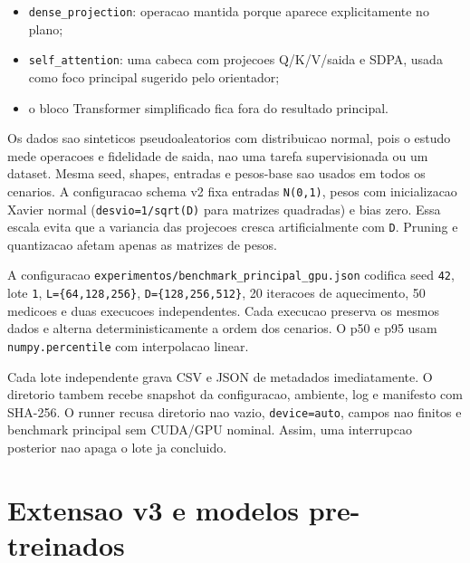 \begin{itemize}
\item \texttt{dense\_\allowbreak{}projection}: operacao mantida porque aparece explicitamente no plano;
\item \texttt{self\_\allowbreak{}attention}: uma cabeca com projecoes Q/K/V/saida e SDPA, usada como foco
principal sugerido pelo orientador;
\item o bloco Transformer simplificado fica fora do resultado principal.
\end{itemize}








Os dados sao sinteticos pseudoaleatorios com distribuicao normal, pois o estudo mede operacoes e fidelidade de saida, nao uma tarefa supervisionada ou um dataset. Mesma seed, shapes, entradas e pesos-base sao usados em todos os cenarios. A configuracao schema v2 fixa entradas \texttt{N(0,1)}, pesos com inicializacao Xavier normal (\texttt{desvio=1/\allowbreak{}sqrt(D)} para matrizes quadradas) e bias zero. Essa escala evita que a variancia das projecoes cresca artificialmente com \texttt{D}. Pruning e quantizacao afetam apenas as matrizes de pesos.







A configuracao \texttt{experimentos/\allowbreak{}benchmark\_\allowbreak{}principal\_\allowbreak{}gpu.\allowbreak{}json} codifica seed \texttt{42}, lote \texttt{1}, \texttt{L=\{64,128,256\}}, \texttt{D=\{128,256,512\}}, 20 iteracoes de aquecimento, 50 medicoes e duas execucoes independentes. Cada execucao preserva os mesmos dados e alterna deterministicamente a ordem dos cenarios. O p50 e p95 usam \texttt{numpy.\allowbreak{}percentile} com interpolacao linear.







Cada lote independente grava CSV e JSON de metadados imediatamente. O diretorio tambem recebe snapshot da configuracao, ambiente, log e manifesto com SHA-256. O runner recusa diretorio nao vazio, \texttt{device=auto}, campos nao finitos e benchmark principal sem CUDA/GPU nominal. Assim, uma interrupcao posterior nao apaga o lote ja concluido.

\section{Extensao v3 e modelos pre-treinados}

